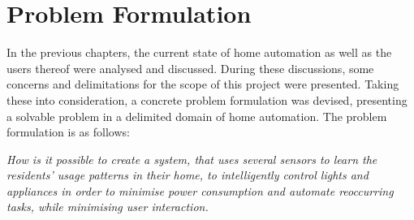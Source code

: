 \section{Problem Formulation}
In the previous chapters, the current state of home automation as well as the users thereof were analysed and discussed. During these discussions, some concerns and delimitations for the scope of this project were presented. Taking these into consideration, a concrete problem formulation was devised, presenting a solvable problem in a delimited domain of home automation. The problem formulation is as follows:

\emph{How is it possible to create a system, that uses several sensors to learn the residents’ usage patterns in their home, to intelligently control lights and appliances in order to minimise power consumption and automate reoccurring tasks, while minimising user interaction.}
